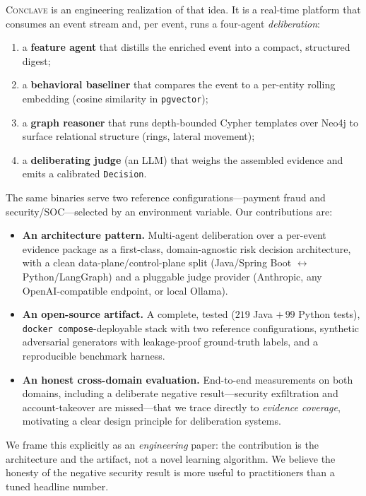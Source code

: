 \documentclass[sigconf,nonacm,screen]{acmart}
\begin{document}
\textsc{Conclave} is an engineering realization of that idea. It is a real-time
platform that consumes an event stream and, per event, runs a four-agent
\emph{deliberation}:

\begin{enumerate}
  \item a \textbf{feature agent} that distills the enriched event into a compact,
        structured digest;
  \item a \textbf{behavioral baseliner} that compares the event to a per-entity
        rolling embedding (cosine similarity in \texttt{pgvector});
  \item a \textbf{graph reasoner} that runs depth-bounded Cypher templates over
        Neo4j to surface relational structure (rings, lateral movement);
  \item a \textbf{deliberating judge} (an LLM) that weighs the assembled evidence
        and emits a calibrated \texttt{Decision}.
\end{enumerate}

\noindent The same binaries serve two reference configurations---payment fraud
and security/SOC---selected by an environment variable. Our contributions are:

\begin{itemize}
  \item \textbf{An architecture pattern.} Multi-agent deliberation over a
        per-event evidence package as a first-class, domain-agnostic risk
        decision architecture, with a clean data-plane/control-plane split
        (Java/Spring Boot $\leftrightarrow$ Python/LangGraph) and a pluggable
        judge provider (Anthropic, any OpenAI-compatible endpoint, or local
        Ollama).
  \item \textbf{An open-source artifact.} A complete, tested ($219$ Java $+\,99$
        Python tests), \texttt{docker compose}-deployable stack with two
        reference configurations, synthetic adversarial generators with
        leakage-proof ground-truth labels, and a reproducible benchmark harness.
  \item \textbf{An honest cross-domain evaluation.} End-to-end measurements on
        both domains, including a deliberate negative result---security
        exfiltration and account-takeover are missed---that we trace directly to
        \emph{evidence coverage}, motivating a clear design principle for
        deliberation systems.
\end{itemize}

We frame this explicitly as an \emph{engineering} paper: the contribution is the
architecture and the artifact, not a novel learning algorithm. We believe the
honesty of the negative security result is more useful to practitioners than a
tuned headline number.
\end{document}
